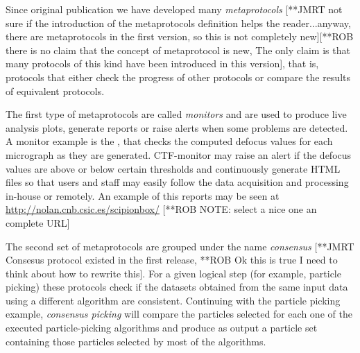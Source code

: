 
Since \scipion original publication we have developed many \emph{metaprotocols} [**JMRT not sure if the 
introduction of the metaprotocols definition helps the reader...anyway, there are metaprotocols in the first
version, so this is not completely new][**ROB there is no claim that the concept of metaprotocol is new, The only claim is that many protocols of this kind have been introduced in this version], that is, 
protocols that either check the progress of other protocols or compare the results of equivalent protocols.

The first type of metaprotocols are called \emph{monitors} and are used to produce live analysis plots, generate reports or raise alerts when some problems are detected. A monitor example is the , that checks the computed defocus values for each micrograph as they are generated. CTF-monitor may raise an alert if the defocus values are above or below certain thresholds and continuously generate HTML files so that users and staff may easily follow the data acquisition and processing in-house or remotely. An example of this reports may be seen at \url{http://nolan.cnb.csic.es/scipionbox/} [**ROB NOTE: select a nice one an complete URL]%

The second set of metaprotocols are grouped under the name \emph{consensus} [**JMRT Consesus protocol existed in the first release, **ROB Ok this is true I need to think about how to rewrite this]. For a given logical step (for example, particle picking) these protocols check if the datasets obtained from the same input data using a different algorithm are consistent. Continuing with the particle picking example, \emph{consensus picking} will compare the particles selected for each one of the executed particle-picking algorithms and produce as output a particle set containing those particles selected by most of the algorithms.

